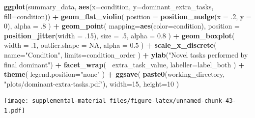 \documentclass[]{book}
\newenvironment{Shaded}{\begin{snugshade}}{\end{snugshade}}
\newcommand{\DataTypeTok}[1]{\textcolor[rgb]{0.13,0.29,0.53}{#1}}
\newcommand{\DecValTok}[1]{\textcolor[rgb]{0.00,0.00,0.81}{#1}}
\newcommand{\FloatTok}[1]{\textcolor[rgb]{0.00,0.00,0.81}{#1}}
\newcommand{\KeywordTok}[1]{\textcolor[rgb]{0.13,0.29,0.53}{\textbf{#1}}}
\newcommand{\NormalTok}[1]{#1}
\newcommand{\OperatorTok}[1]{\textcolor[rgb]{0.81,0.36,0.00}{\textbf{#1}}}
\newcommand{\OtherTok}[1]{\textcolor[rgb]{0.56,0.35,0.01}{#1}}
\newcommand{\StringTok}[1]{\textcolor[rgb]{0.31,0.60,0.02}{#1}}
\begin{document}
\begin{Shaded}
\begin{Highlighting}[]
\KeywordTok{ggplot}\NormalTok{(summary_data, }\KeywordTok{aes}\NormalTok{(}\DataTypeTok{x=}\NormalTok{condition, }\DataTypeTok{y=}\NormalTok{dominant_extra_tasks, }\DataTypeTok{fill=}\NormalTok{condition)) }\OperatorTok{+}
\StringTok{  }\KeywordTok{geom_flat_violin}\NormalTok{(}
    \DataTypeTok{position =} \KeywordTok{position_nudge}\NormalTok{(}\DataTypeTok{x =} \FloatTok{.2}\NormalTok{, }\DataTypeTok{y =} \DecValTok{0}\NormalTok{),}
    \DataTypeTok{alpha =} \FloatTok{.8}
\NormalTok{  ) }\OperatorTok{+}
\StringTok{  }\KeywordTok{geom_point}\NormalTok{(}
    \DataTypeTok{mapping=}\KeywordTok{aes}\NormalTok{(}\DataTypeTok{color=}\NormalTok{condition),}
    \DataTypeTok{position =} \KeywordTok{position_jitter}\NormalTok{(}\DataTypeTok{width =} \FloatTok{.15}\NormalTok{),}
    \DataTypeTok{size =} \FloatTok{.5}\NormalTok{,}
    \DataTypeTok{alpha =} \FloatTok{0.8}
\NormalTok{  ) }\OperatorTok{+}
\StringTok{  }\KeywordTok{geom_boxplot}\NormalTok{(}
    \DataTypeTok{width =} \FloatTok{.1}\NormalTok{,}
    \DataTypeTok{outlier.shape =} \OtherTok{NA}\NormalTok{,}
    \DataTypeTok{alpha =} \FloatTok{0.5}
\NormalTok{  ) }\OperatorTok{+}
\StringTok{  }\KeywordTok{scale_x_discrete}\NormalTok{(}
    \DataTypeTok{name=}\StringTok{"Condition"}\NormalTok{,}
    \DataTypeTok{limits=}\NormalTok{condition_order}
\NormalTok{  ) }\OperatorTok{+}
\StringTok{  }\KeywordTok{ylab}\NormalTok{(}\StringTok{"Novel tasks performed by final dominant"}\NormalTok{) }\OperatorTok{+}
\StringTok{  }\KeywordTok{facet_wrap}\NormalTok{(}
    \OperatorTok{~}\NormalTok{extra_task_value,}
    \DataTypeTok{labeller=}\NormalTok{label_both}
\NormalTok{  ) }\OperatorTok{+}
\StringTok{  }\KeywordTok{theme}\NormalTok{(}
    \DataTypeTok{legend.position=}\StringTok{"none"}
\NormalTok{  ) }\OperatorTok{+}
\StringTok{  }\KeywordTok{ggsave}\NormalTok{(}
    \KeywordTok{paste0}\NormalTok{(working_directory, }\StringTok{"plots/dominant-extra-tasks.pdf"}\NormalTok{),}
    \DataTypeTok{width=}\DecValTok{15}\NormalTok{,}
    \DataTypeTok{height=}\DecValTok{10}
\NormalTok{  )}
\end{Highlighting}
\end{Shaded}

\texttt{[image: supplemental-material\_files/figure-latex/unnamed-chunk-43-1.pdf]}

\begin{Shaded}
\end{Shaded}
\end{document}
